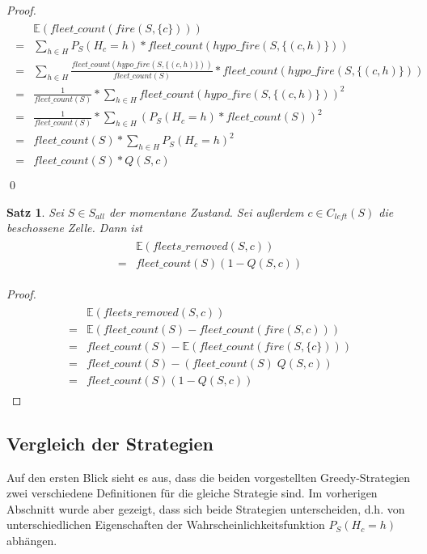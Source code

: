 \documentclass[a4paper,12pt]{llncs}
\numberwithin{equation}{section}
\newtheorem{satz}{Satz}
\begin{document}
\begin{proof}
\begin{align}
\begin{split}
&\mathds{E}(fleet\_count(fire(S,\{c\})))\\
=&\sum_{h \in H} P_S(H_{c} = h) * fleet\_count(hypo\_fire(S,\{(c,h)\}))\\
=&\sum_{h \in H} \frac{fleet\_count(hypo\_fire(S,\{(c,h)\}))}{fleet\_count(S)}* fleet\_count(hypo\_fire(S,\{(c,h)\}))\\
=&\frac{1}{fleet\_count(S)} * \sum_{h \in H} fleet\_count(hypo\_fire(S,\{(c,h)\}))^2\\
=&\frac{1}{fleet\_count(S)} * \sum_{h \in H} (P_S(H_{c} = h) * fleet\_count(S))^2\\
=&fleet\_count(S) * \sum_{h \in H} P_S(H_{c} = h)^2\\
=&fleet\_count(S) * Q(S,c)\\
\end{split}
\end{align}
\qed
\end{proof}

\begin{satz}
Sei $S\in S_{all}$ der momentane Zustand.
Sei außerdem $c \in C_{left}(S)$ die beschossene Zelle.
Dann ist
\begin{align}
\begin{split}
&\mathds{E}(fleets\_removed(S,c))\\
=&fleet\_count(S) (1 - Q(S,c))
\end{split}
\end{align}
\end{satz}

\begin{proof}
\begin{align}
\begin{split}
&\mathds{E}(fleets\_removed(S,c))\\
=&\mathds{E}(fleet\_count(S) - fleet\_count(fire(S,c)))\\
=&fleet\_count(S) - \mathds{E}(fleet\_count(fire(S,\{c\})))\\
=&fleet\_count(S) - (fleet\_count(S)\; Q(S,c))\\
=&fleet\_count(S) (1 - Q(S,c))
\end{split}
\end{align}
\end{proof}

\subsection{Vergleich der Strategien}
Auf den ersten Blick sieht es aus, dass die beiden vorgestellten Greedy-Strategien zwei verschiedene Definitionen für die gleiche Strategie sind. Im vorherigen Abschnitt wurde aber gezeigt, dass sich beide Strategien unterscheiden, d.h. von unterschiedlichen Eigenschaften der Wahrscheinlichkeitsfunktion $P_S(H_{c} = h)$ abhängen.
\end{document}
